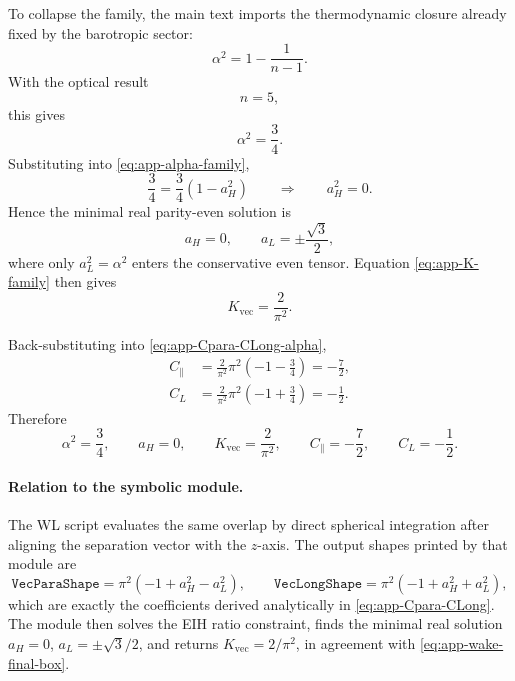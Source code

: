 \documentclass[11pt]{article}
\newcommand{\Kvec}{K_{\mathrm{vec}}}
\newcommand{\alphaSq}{\alpha^2}
\newcommand{\Cpara}{C_{\parallel}}
\newcommand{\CLong}{C_{L}}
\begin{document}
To collapse the family, the main text imports the thermodynamic closure already fixed by
the barotropic sector:
\begin{equation}
\alphaSq = 1-\frac{1}{n-1}.
\label{eq:app-alpha-thermo}
\end{equation}
With the optical result
\begin{equation}
n=5,
\label{eq:app-n-five-wake}
\end{equation}
this gives
\begin{equation}
\alphaSq=\frac34.
\label{eq:app-alpha-three-quarters}
\end{equation}
Substituting into \eqref{eq:app-alpha-family},
\begin{equation}
\frac34=\frac34(1-a_H^2)
\qquad\Longrightarrow\qquad
a_H^2=0.
\label{eq:app-aHsq-zero}
\end{equation}
Hence the minimal real parity-even solution is
\begin{equation}
a_H=0,
\qquad
a_L=\pm \frac{\sqrt3}{2},
\label{eq:app-aH-aL-final}
\end{equation}
where only \(a_L^2=\alphaSq\) enters the conservative even tensor. Equation
\eqref{eq:app-K-family} then gives
\begin{equation}
\Kvec=\frac{2}{\pi^2}.
\label{eq:app-K-final}
\end{equation}

Back-substituting into \eqref{eq:app-Cpara-CLong-alpha},
\begin{align}
\Cpara
&=
\frac{2}{\pi^2}\pi^2\left(-1-\frac34\right)
=
-\frac72,
\label{eq:app-final-Cpara}
\\[3pt]
\CLong
&=
\frac{2}{\pi^2}\pi^2\left(-1+\frac34\right)
=
-\frac12.
\label{eq:app-final-CLong}
\end{align}
Therefore
\begin{equation}
\boxed{
\alphaSq=\frac34,
\qquad
a_H=0,
\qquad
\Kvec=\frac{2}{\pi^2},
\qquad
\Cpara=-\frac72,
\qquad
\CLong=-\frac12.
}
\label{eq:app-wake-final-box}
\end{equation}

\paragraph{Relation to the symbolic module.}
The WL script evaluates the same overlap by direct spherical integration after aligning the
separation vector with the \(z\)-axis. The output shapes printed by that module are
\begin{equation}
\texttt{VecParaShape}=\pi^2(-1+a_H^2-a_L^2),
\qquad
\texttt{VecLongShape}=\pi^2(-1+a_H^2+a_L^2),
\end{equation}
which are exactly the coefficients derived analytically in
\eqref{eq:app-Cpara-CLong}. The module then solves the EIH ratio constraint, finds the
minimal real solution \(a_H=0\), \(a_L=\pm \sqrt{3}/2\), and returns
\(\Kvec=2/\pi^2\), in agreement with \eqref{eq:app-wake-final-box}.
\end{document}
